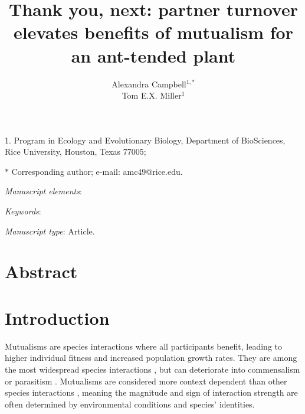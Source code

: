 \documentclass[11pt]{article}
\title{Thank you, next: partner turnover elevates benefits of mutualism for an ant-tended plant}
\author{Alexandra Campbell$^{1,\ast}$ \\ 
	Tom E.X. Miller$^{1}$}
\date{}
\begin{document}
	
	\maketitle
	
	\noindent{} 1. Program in Ecology and Evolutionary Biology, Department of BioSciences, Rice University, Houston, Texas 77005;
	
	\noindent{} $\ast$ Corresponding author; e-mail: amc49@rice.edu.
	
	
	\textit{Manuscript elements}: 
	
	\bigskip
	
	\textit{Keywords}: 
	
	\bigskip
	
	\textit{Manuscript type}: Article.
	
	\bigskip
	
	
\linenumbers{}
\modulolinenumbers[3]

\newpage{}

\section*{Abstract}


\newpage{}

\section*{Introduction}

Mutualisms are species interactions where all participants benefit, leading to higher individual fitness and increased population growth rates. 
They are among the most widespread species interactions \citep{Bronstein1994,Chamberlain2014,Frederickson2013}, but can deteriorate into commensalism or parasitism  \citep{Rodriguez-Rodriguez2017,Song2020,Mandyam2014,Thrall2007, Bahia2022}.
Mutualisms are considered more context dependent than other species interactions \citep{Chamberlain2014,Frederickson2013}, meaning the magnitude and sign of interaction strength are often determined by environmental conditions and species' identities.
\end{document}
